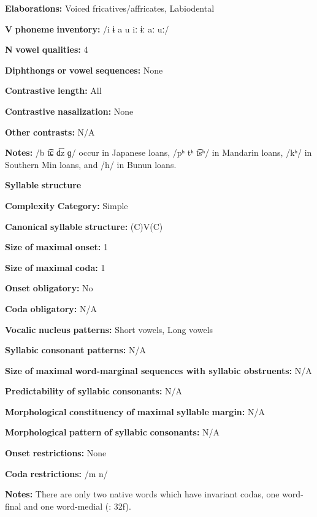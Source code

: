 \textbf{Elaborations:} Voiced fricatives/affricates, Labiodental

\textbf{V} \textbf{phoneme} \textbf{inventory:} /i ɨ a u iː ɨː aː uː/

\textbf{N} \textbf{vowel} \textbf{qualities:} 4

\textbf{Diphthongs} \textbf{or} \textbf{vowel} \textbf{sequences:} None

\textbf{Contrastive} \textbf{length:} All

\textbf{Contrastive} \textbf{nasalization:} None

\textbf{Other} \textbf{contrasts:} N/A

\textbf{Notes:} /b t͡ɕ d͡z ɡ/ occur in Japanese loans, /pʰ tʰ t͡sʰ/ in Mandarin loans, /kʰ/ in Southern Min loans, and /h/ in Bunun loans.

\textbf{Syllable} \textbf{structure}

\textbf{Complexity} \textbf{Category:} Simple

\textbf{Canonical} \textbf{syllable} \textbf{structure:} (C)V(C) \citep[32-33]{Pan2012}

\textbf{Size} \textbf{of} \textbf{maximal} \textbf{onset:} 1

\textbf{Size} \textbf{of} \textbf{maximal} \textbf{coda:} 1

\textbf{Onset} \textbf{obligatory:} No

\textbf{Coda} \textbf{obligatory:} N/A

\textbf{Vocalic} \textbf{nucleus} \textbf{patterns:} Short vowels, Long vowels

\textbf{Syllabic} \textbf{consonant} \textbf{patterns:} N/A

\textbf{Size} \textbf{of} \textbf{maximal} \textbf{word{}-marginal sequences with syllabic obstruents:} N/A

\textbf{Predictability} \textbf{of} \textbf{syllabic} \textbf{consonants:} N/A

\textbf{Morphological} \textbf{constituency} \textbf{of} \textbf{maximal} \textbf{syllable} \textbf{margin:} N/A

\textbf{Morphological} \textbf{pattern} \textbf{of} \textbf{syllabic} \textbf{consonants:} N/A

\textbf{Onset} \textbf{restrictions:} None

\textbf{Coda} \textbf{restrictions:} /m n/

\textbf{Notes:} There are only two native words which have invariant codas, one word-final and one word-medial (\citealt{Pan2012}: 32f).

